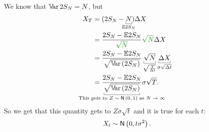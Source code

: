 \documentclass[12pt]{report}
\begin{document}
\begin{remark}
	We know that $\mathbb{V}\!\mathrm{ar}\, 2S_{N}=N$, but
	\begin{align*}
		X_{T}&=(2S_{N}-\ubracketthin{N}_{\mathclap{\evs 2 S_{N}}})\Delta X\\
		&=\frac{2 S_{N}-\evs 2 S_{N}}{\mathcolor{Green4}{\sqrt{N}}}\mathcolor{Green4}{\sqrt{N}}\Delta X\\
		&=\frac{2S_{N}-\evs 2 S_{N}}{\sqrt{\var(2S_{N})}}\ubracketthin{\sqrt{N}}_{\sqrt{\frac{T}{\Delta t}}}\ubracketthin{\Delta X}_{{\sigma\sqrt{\Delta t}}}\\
		&=\frac{2S_{N}-\evs 2 S_{N}}{\ubracketthin{\sqrt{\var(2S_{N})}}_{\claptext{This gets to $Z\distnorm{0,1}$ as $N\to\infty$}}}\sigma\sqrt{T}.
	\end{align*}
	So we get that this quantity gets to $Z\sigma\sqrt{t}$ and it is true for each $t$:
	\begin{equation*}
		X_{t}\sim\mathsf{N}\left(0,t\sigma^{2}\right).
	\end{equation*}
\end{remark}
\end{document}
